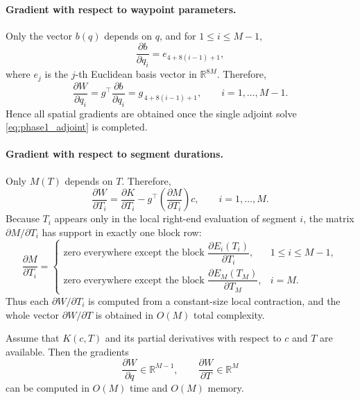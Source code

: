 \paragraph{Gradient with respect to waypoint parameters.}
Only the vector $b(q)$ depends on $q$, and for $1\le i\le M-1$,
\[
  \frac{\partial b}{\partial q_i}
  =
  e_{4+8(i-1)+1},
\]
where $e_j$ is the $j$-th Euclidean basis vector in $\mathbb R^{8M}$. Therefore,
\begin{equation}
  \label{eq:phase1_grad_qi}
  \frac{\partial W}{\partial q_i}
  =
  g^\top \frac{\partial b}{\partial q_i}
  =
  g_{\,4+8(i-1)+1},
  \qquad
  i=1,\dots,M-1.
\end{equation}
Hence all spatial gradients are obtained once the single adjoint solve \eqref{eq:phase1_adjoint}
is completed.

\paragraph{Gradient with respect to segment durations.}
Only $M(T)$ depends on $T$. Therefore,
\begin{equation}
  \label{eq:phase1_grad_Ti_general}
  \frac{\partial W}{\partial T_i}
  =
  \frac{\partial K}{\partial T_i}
  -
  g^\top
  \left(\frac{\partial M}{\partial T_i}\right)c,
  \qquad
  i=1,\dots,M.
\end{equation}
Because $T_i$ appears only in the local right-end evaluation of segment $i$, the matrix
$\partial M/\partial T_i$ has support in exactly one block row:
\begin{equation}
  \label{eq:phase1_dM_support}
  \frac{\partial M}{\partial T_i}
  =
  \begin{cases}
    \text{zero everywhere except the block } \dfrac{\partial E_i(T_i)}{\partial T_i}, & 1\le i\le M-1,\\[1.2ex]
    \text{zero everywhere except the block } \dfrac{\partial E_M(T_M)}{\partial T_M}, & i=M.
  \end{cases}
\end{equation}
Thus each $\partial W/\partial T_i$ is computed from a constant-size local contraction, and the
whole vector $\partial W/\partial T$ is obtained in $O(M)$ total complexity.

\begin{proposition}
  \label{prop:phase1_linear_gradient}
  Assume that $K(c,T)$ and its partial derivatives with respect to $c$ and $T$ are available.
  Then the gradients
  \[
    \frac{\partial W}{\partial q}
    \in \mathbb R^{M-1},
    \qquad
    \frac{\partial W}{\partial T}
    \in \mathbb R^{M}
  \]
  can be computed in $O(M)$ time and $O(M)$ memory.
\end{proposition}

